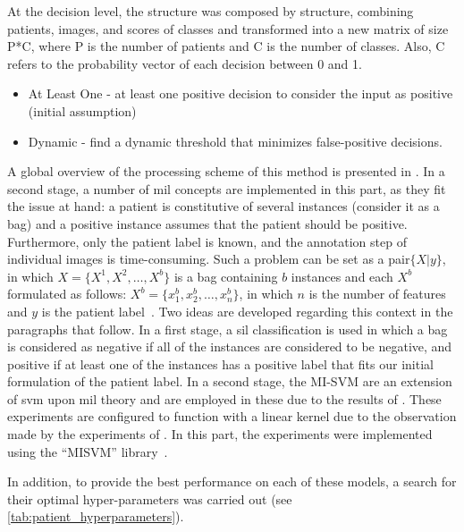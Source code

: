 \documentclass[journal,article,submit,moreauthors,pdftex, applsci]{Definitions/mdpi}
\begin{document}
At the decision level, the structure was composed by structure, combining patients, images, and scores of classes and transformed into a new matrix of size P*C, where P is the number of patients and C is the number of classes. Also, C refers to the probability vector of each decision between 0 and 1.
\begin{itemize}
\item At Least One - at least one positive decision to consider the input as positive (initial assumption)
\item Dynamic - find a dynamic threshold that minimizes false-positive decisions.
\end{itemize}
A global overview of the processing scheme of this method is presented in .
In a second stage, a number of \ac{mil} concepts are implemented in this part, as they fit the issue at hand: a patient is constitutive of several instances (consider it as a bag) and a positive instance assumes that the patient should be positive. Furthermore, only the patient label is known, and the annotation step of individual images is time-consuming. Such a problem can be set as a pair\(\{X|y\}\), in which \(X=\{X^1,X^2,\ldots,X^b\}\) is a bag containing \(b\) instances and each \(X^b\) formulated as follows: \(X^b=\{x^b_1,x^b_2,\ldots,x^b_n\}\), in which \(n\) is the number of features and \(y\) is the patient label~\cite{foulds_frank_2010}. Two ideas are developed regarding this context in the paragraphs that follow. In a first stage, a \ac{sil} classification is used in which a bag is considered as negative if all of the instances are considered to be negative, and positive if at least one of the instances has a positive label that fits our initial formulation of the patient label. In a second stage, the MI-SVM are an extension of \ac{svm} upon \ac{mil} theory and are employed in these due to the results of . These experiments are configured to function with a linear kernel due to the observation made by the experiments of . In this part, the experiments were implemented using the “MISVM” library~\cite{Doran2014}.\par
In addition, to provide the best performance on each of these models, a search for their optimal hyper-parameters was carried out (see \cref{tab:patient_hyperparameters}).\par
\end{document}
